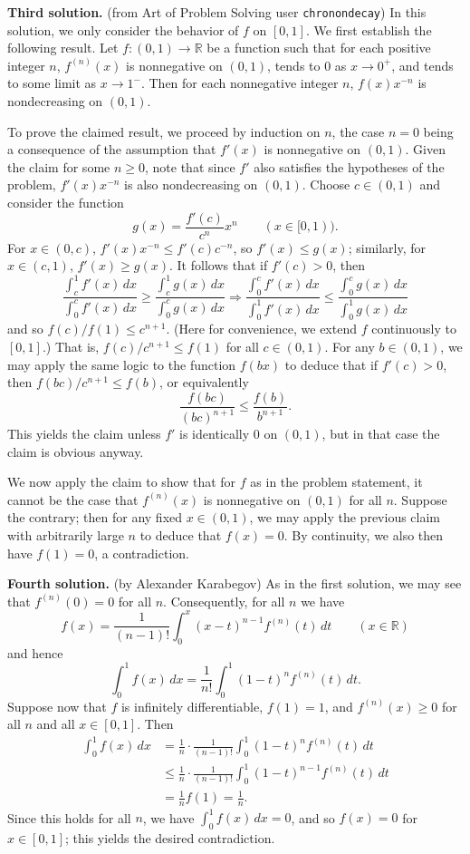 \documentclass[amssymb,twocolumn,pra,10pt,aps]{revtex4-1}
\begin{document}
\begin{itemize}
\noindent
\textbf{Third solution.}
(from Art of Problem Solving user \texttt{chronondecay})
In this solution, we only consider the behavior of $f$ on $[0,1]$.
We first establish the following result.
Let $f: (0,1) \to \mathbb{R}$ be a function such that for each positive integer $n$, $f^{(n)}(x)$ is nonnegative on $(0,1)$, tends to 0 as $x \to 0^+$, and tends to some limit as $x \to 1^-$.
Then for each nonnegative integer $n$, $f(x) x^{-n}$ is nondecreasing on $(0,1)$.

To prove the claimed result, we proceed by induction on $n$, the case $n=0$ being a consequence of the assumption that $f'(x)$ is nonnegative on $(0,1)$. Given the claim for some $n \geq 0$, note that
since $f'$ also satisfies the hypotheses of the problem, $f'(x) x^{-n}$ is also nondecreasing on $(0,1)$.
Choose $c \in (0,1)$ and consider the function
\[
g(x) = \frac{f'(c)}{c^n} x^n \qquad (x \in [0,1)).
\]
For $x \in (0,c)$, $f'(x)x^{-n} \leq f'(c) c^{-n}$, so $f'(x) \leq g(x)$;
similarly, for $x \in (c,1)$, $f'(x) \geq g(x)$. It follows that if $f'(c) > 0$, then
\[
\frac{\int_c^1 f'(x)\,dx}{\int_0^c f'(x)\,dx} \geq \frac{\int_c^1 g(x)\,dx}{\int_0^c g(x)\,dx}
\Rightarrow
\frac{\int_0^c f'(x)\,dx}{\int_0^1 f'(x)\,dx} \leq \frac{\int_0^c g(x)\,dx}{\int_0^1 g(x)\,dx}
\]
and so $f(c)/f(1) \leq c^{n+1}$. (Here for convenience, we extend $f$ continuously to $[0,1]$.)
That is, $f(c)/c^{n+1} \leq f(1)$ for all $c \in (0,1)$.
For any $b \in (0,1)$, we may apply the same logic to the function $f(bx)$ to deduce that
if $f'(c) > 0$, then $f(bc)/c^{n+1} \leq f(b)$, or equivalently 
\[
\frac{f(bc)}{(bc)^{n+1}} \leq \frac{f(b)}{b^{n+1}}.
\]
This yields the claim unless $f'$ is identically 0 on $(0,1)$, but in that case the claim is obvious anyway.

We now apply the claim to show that for $f$ as in the problem statement, it cannot be the case that
$f^{(n)}(x)$ is nonnegative on $(0,1)$ for all $n$. Suppose the contrary; then for any fixed $x \in (0,1)$,
we may apply the previous claim with arbitrarily large $n$ to deduce that $f(x) = 0$. By continuity, we also then have
$f(1) = 0$, a contradiction.

\noindent
\textbf{Fourth solution.}
(by Alexander Karabegov)
As in the first solution, we may see that $f^{(n)}(0) = 0$ for all $n$.
Consequently, for all $n$ we have
\[
f(x) = \frac{1}{(n-1)!} \int_0^x (x-t)^{n-1} f^{(n)}(t)\,dt \qquad (x \in \mathbb{R})
\]
and hence
\[
\int_0^1 f(x)\,dx = \frac{1}{n!} \int_0^1 (1-t)^n f^{(n)}(t)\,dt. 
\]
Suppose now that $f$ is infinitely differentiable, $f(1) = 1$, and $f^{(n)}(x) \geq 0$ for all $n$ and all $x \in [0,1]$. Then
\begin{align*}
\int_0^1 f(x)\,dx &= \frac{1}{n} \cdot \frac{1}{(n-1)!} \int_0^1 (1-t)^n f^{(n)}(t)\,dt \\
&\leq \frac{1}{n} \cdot \frac{1}{(n-1)!} \int_0^1 (1-t)^{n-1} f^{(n)}(t)\,dt \\
&= \frac{1}{n} f(1) = \frac{1}{n}.
\end{align*}
Since this holds for all $n$, we have $\int_0^1 f(x)\,dx = 0$, and so $f(x) = 0$ for $x \in [0,1]$; this yields the desired contradiction.


\end{itemize}
\end{document}
